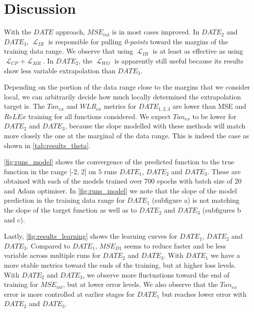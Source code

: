 \documentclass[runningheads]{llncs}
\DeclareMathOperator{\Lagr}{\mathcal{L}}
\begin{document}

\section{Discussion}

With the $DATE$ approach, $MSE_{int}$ is in most cases improved.
In $DATE_2$ and $DATE_3$, $\Lagr_{IR}$ is responsible for pulling \emph{0-points} toward the margins of the training data range. 
We observe that using $\Lagr_{IR}$ is at least as effective as using $\Lagr_{CP}$+$\Lagr_{MR}$.
In $DATE_2$, the $\Lagr_{WO}$ is apparently still useful because its results show less variable extrapolation than $DATE_3$.

Depending on the portion of the data range close to the margins that we consider local, we can arbitrarily decide how much locally determined the extrapolation target is.
The $Tan_{ex}$ and $WLR_{ex}$ metrics for $DATE_{1,2,3}$ are lower than MSE and $ReLEx$ training for all functions considered.
We expect $Tan_{ex}$ to be lower for $DATE_2$ and $DATE_3$, because the slope modelled with these methods will match more closely the one at the marginal of the data range. 
This is indeed the case as shown in \autoref{tab:results_theta}.

\autoref{fig:runs_model} shows the convergence of the predicted function to the true function in the range [-2, 2] on $5$ runs $DATE_1$, $DATE_2$ and $DATE_3$. These are obtained with each of the models trained over 700 epochs with batch size of 20 and Adam optimiser. 
In \autoref{fig:runs_model} we note that the slope of the model prediction in the training data range for $DATE_1$ (subfigure a) is not matching the slope of the target function as well as to $DATE_2$ and $DATE_3$ (subfigures b and c).

Lastly, \autoref{fig:results_learning} shows the learning curves for $DATE_1$, $DATE_2$ and $DATE_3$.
Compared to $DATE_1$, $MSE_{D1}$ seems to reduce faster and be less variable across multiple runs for $DATE_2$ and $DATE_3$.
With $DATE_1$ we have a more stable metrics toward the ends of the training, but at higher loss levels.
With $DATE_2$ and $DATE_3$, we observe more fluctuations toward the end of training for $MSE_{int}$, but at lower error levels.
We also observe that the $Tan_{ex}$ error is more controlled at earlier stages for $DATE_1$ but reaches lower error with $DATE_2$ and $DATE_3$.
\end{document}
